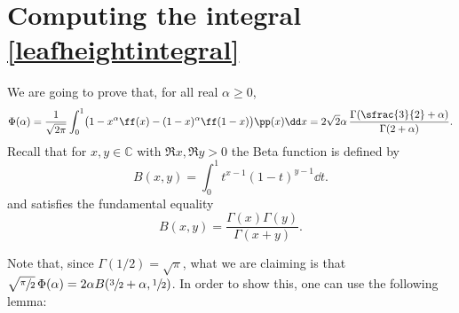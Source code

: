 \section{Computing the integral \texorpdfstring{\eqref{leafheightintegral}}{ref}}\label{sec: Appendix}
We are going to prove that, for all real $\alpha\geq 0$,
\begin{equation}\label{eq:Phi(alpha)}
\Phi(\alpha) = \frac{1}{\sqrt{2\pi}}\int_{0}^1 \bigl(1-x^{\alpha}\ff(x)-(1-x)^{\alpha}\ff(1-x) \bigr) \pp(x) \dd x=2\sqrt{2}\alpha\,\frac{\Gamma(\sfrac{3}{2}+\alpha)}{\Gamma(2+\alpha)}.
\end{equation}
Recall that for $x, y \in \mathbb{C}$ with $\Re x, \Re y > 0$ the Beta function is defined by
\[
B(x,y) = \int_0^1 t^{x-1} (1-t)^{y-1} \dd t.
\]
and satisfies the fundamental equality
\[
B(x,y) = \frac{\Gamma(x)\Gamma(y)}{\Gamma(x+y)}.
\]

Note that, since $\Gamma(1/2)=\sqrt{\pi}$, what we are claiming is that $\sqrt{\sfrac{\pi}{2}}\,\Phi(\alpha)=2\alpha B(\sfrac{3}{2}+\alpha, \sfrac{1}{2})$. In order to show this, one can use the following lemma:

